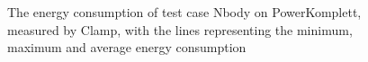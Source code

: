 \begin{figure}
                    \caption{The energy consumption of test case Nbody on PowerKomplett, measured by Clamp, with the lines representing the minimum, maximum and average energy consumption} \label{fig:time_series_Nbody_PowerKomplett_Clamp}
                    \end{figure}
                    